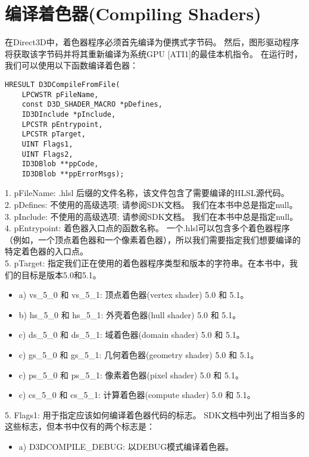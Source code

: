 \section{编译着色器(Compiling Shaders)}
\begin{flushleft}
在Direct3D中，着色器程序必须首先编译为便携式字节码。 然后，图形驱动程序将获取该字节码并将其重新编译为系统GPU [ATI1]的最佳本机指令。 在运行时，我们可以使用以下函数编译着色器：\\
\begin{lstlisting}
HRESULT D3DCompileFromFile(
    LPCWSTR pFileName,
    const D3D_SHADER_MACRO *pDefines,
    ID3DInclude *pInclude,
    LPCSTR pEntrypoint,
    LPCSTR pTarget,
    UINT Flags1,
    UINT Flags2,
    ID3DBlob **ppCode,
    ID3DBlob **ppErrorMsgs);
\end{lstlisting}
1. pFileName: .hlsl 后缀的文件名称，该文件包含了需要编译的HLSL源代码。\\
2. pDefines: 不使用的高级选项; 请参阅SDK文档。 我们在本书中总是指定null。\\
3. pInclude: 不使用的高级选项; 请参阅SDK文档。 我们在本书中总是指定null。\\
4. pEntrypoint: 着色器入口点的函数名称。 一个.hlsl可以包含多个着色器程序（例如，一个顶点着色器和一个像素着色器），所以我们需要指定我们想要编译的特定着色器的入口点。\\
5. pTarget: 指定我们正在使用的着色器程序类型和版本的字符串。在本书中，我们的目标是版本5.0和5.1。\\
\begin{itemize}
  \item a) vs\_5\_0 和 vs\_5\_1: 顶点着色器(vertex shader) 5.0 和 5.1。
  \item b) hs\_5\_0 和 hs\_5\_1: 外壳着色器(hull shader) 5.0 和 5.1。
  \item c) ds\_5\_0 和 ds\_5\_1: 域着色器(domain shader) 5.0 和 5.1。
  \item c) gs\_5\_0 和 gs\_5\_1: 几何着色器(geometry shader) 5.0 和 5.1。
  \item c) ps\_5\_0 和 ps\_5\_1: 像素着色器(pixel shader) 5.0 和 5.1。
  \item c) cs\_5\_0 和 cs\_5\_1: 计算着色器(compute shader) 5.0 和 5.1。
\end{itemize}
5. Flags1: 用于指定应该如何编译着色器代码的标志。 SDK文档中列出了相当多的这些标志，但本书中仅有的两个标志是：\\
\begin{itemize}
  \item a) D3DCOMPILE\_DEBUG: 以DEBUG模式编译着色器。

\end{itemize}
\end{flushleft}

